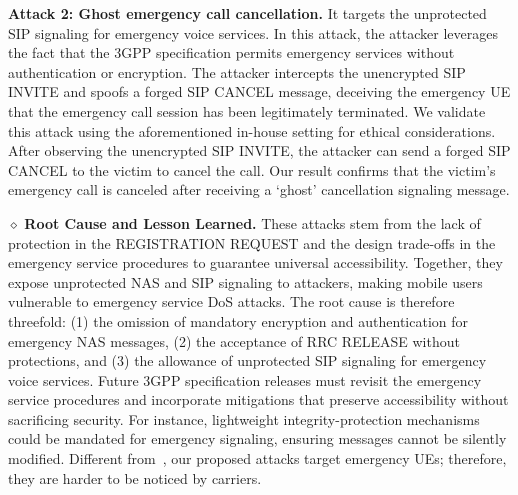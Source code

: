 \noindent \textbf{Attack 2: Ghost emergency call cancellation.} 
It targets the unprotected SIP signaling for emergency voice services. In this attack, the attacker leverages the fact that the 3GPP specification permits emergency services without authentication or encryption. The attacker intercepts the unencrypted SIP INVITE and spoofs a forged SIP CANCEL message, deceiving the emergency UE that the emergency call session has been legitimately terminated. We validate this attack using the aforementioned in-house setting for ethical considerations. After observing the unencrypted SIP INVITE, the attacker can send a forged SIP CANCEL to the victim to cancel the call. Our result confirms that the victim's emergency call is canceled after receiving a `ghost' cancellation signaling message.   

\noindent $\diamond$ \textbf{Root Cause and Lesson Learned.} 
These attacks stem from the lack of protection in the REGISTRATION REQUEST and the design trade-offs in the emergency service procedures to guarantee universal accessibility. Together, they expose unprotected NAS and SIP signaling to attackers, making mobile users vulnerable to emergency service DoS attacks. 
The root cause is therefore threefold: (1) the omission of mandatory encryption and authentication for emergency NAS messages, (2) the acceptance of RRC RELEASE without protections, and (3) the allowance of unprotected SIP signaling for emergency voice services. Future 3GPP specification releases must revisit the emergency service procedures and incorporate mitigations that preserve accessibility without sacrificing security. For instance, lightweight integrity-protection mechanisms could be mandated for emergency signaling, ensuring messages cannot be silently modified. Different from~\cite{hu2022uncovering}, our proposed attacks target emergency UEs; therefore, they are harder to be noticed by carriers.



